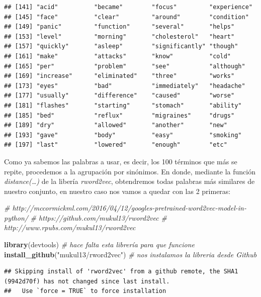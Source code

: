 \documentclass[spanish,]{article}
\newenvironment{Shaded}{\begin{snugshade}}{\end{snugshade}}
\newcommand{\KeywordTok}[1]{\textcolor[rgb]{0.13,0.29,0.53}{\textbf{#1}}}
\newcommand{\StringTok}[1]{\textcolor[rgb]{0.31,0.60,0.02}{#1}}
\newcommand{\CommentTok}[1]{\textcolor[rgb]{0.56,0.35,0.01}{\textit{#1}}}
\newcommand{\NormalTok}[1]{#1}
\begin{document}
\begin{verbatim}
## [141] "acid"          "became"        "focus"         "experience"   
## [145] "face"          "clear"         "around"        "condition"    
## [149] "panic"         "function"      "several"       "helps"        
## [153] "level"         "morning"       "cholesterol"   "heart"        
## [157] "quickly"       "asleep"        "significantly" "though"       
## [161] "make"          "attacks"       "know"          "cold"         
## [165] "per"           "problem"       "see"           "although"     
## [169] "increase"      "eliminated"    "three"         "works"        
## [173] "eyes"          "bad"           "immediately"   "headache"     
## [177] "usually"       "difference"    "caused"        "worse"        
## [181] "flashes"       "starting"      "stomach"       "ability"      
## [185] "bed"           "reflux"        "migraines"     "drugs"        
## [189] "dry"           "allowed"       "another"       "new"          
## [193] "gave"          "body"          "easy"          "smoking"      
## [197] "last"          "lowered"       "enough"        "etc"
\end{verbatim}

Como ya sabemos las palabras a usar, es decir, los 100 términos que más
se repite, procedemos a la agrupación por sinónimos. En donde, mediante
la función \emph{distance(\ldots{})} de la libería \emph{rword2vec},
obtendremos todas palabras más similares de nuestro conjunto, en nuestro
caso nos vamos a quedar con las 2 primeras:

\begin{Shaded}
\begin{Highlighting}[]
\CommentTok{# http://mccormickml.com/2016/04/12/googles-pretrained-word2vec-model-in-python/}
\CommentTok{# https://github.com/mukul13/rword2vec}
\CommentTok{# http://www.rpubs.com/mukul13/rword2vec}

\KeywordTok{library}\NormalTok{(devtools)                   }\CommentTok{# hace falta esta librería para que funcione}
\KeywordTok{install_github}\NormalTok{(}\StringTok{"mukul13/rword2vec"}\NormalTok{) }\CommentTok{# nos instalamos la libreria desde Github}
\end{Highlighting}
\end{Shaded}

\begin{verbatim}
## Skipping install of 'rword2vec' from a github remote, the SHA1 (9942d70f) has not changed since last install.
##   Use `force = TRUE` to force installation
\end{verbatim}
\end{document}
